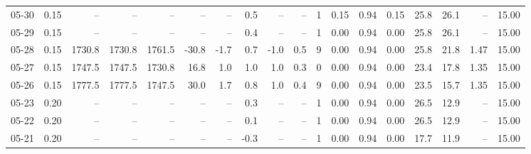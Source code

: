\begin{threeparttable}
{\begin{tabular}{lrrrrrrrrrrrrrrrrr}
  05-30 &     0.15 &     -- &     -- &     -- &         -- &             -- &                       0.5 &                       -- &                  -- &              1 &       0.15 &      0.94 &           0.15 &             25.8 &                26.1 &              -- &                  15.00 \\
  05-29 &     0.15 &     -- &     -- &     -- &         -- &             -- &                       0.4 &                       -- &                  -- &              1 &       0.00 &      0.94 &           0.00 &             25.8 &                26.1 &              -- &                  15.00 \\
  05-28 &     0.15 & 1730.8 & 1730.8 & 1761.5 &      -30.8 &           -1.7 &                       0.7 &                     -1.0 &                 0.5 &              9 &       0.00 &      0.94 &           0.00 &             25.8 &                21.8 &            1.47 &                  15.00 \\
  05-27 &     0.15 & 1747.5 & 1747.5 & 1730.8 &       16.8 &            1.0 &                       1.0 &                      1.0 &                 0.3 &              0 &       0.00 &      0.94 &           0.00 &             23.4 &                17.8 &            1.35 &                  15.00 \\
  05-26 &     0.15 & 1777.5 & 1777.5 & 1747.5 &       30.0 &            1.7 &                       0.8 &                      1.0 &                 0.4 &              9 &       0.00 &      0.94 &           0.00 &             23.5 &                15.7 &            1.35 &                  15.00 \\
  05-23 &     0.20 &     -- &     -- &     -- &         -- &             -- &                       0.3 &                       -- &                  -- &              1 &       0.00 &      0.94 &           0.00 &             26.5 &                12.9 &              -- &                  15.00 \\
  05-22 &     0.20 &     -- &     -- &     -- &         -- &             -- &                       0.1 &                       -- &                  -- &              1 &       0.00 &      0.94 &           0.00 &             26.5 &                12.9 &              -- &                  15.00 \\
  05-21 &     0.20 &     -- &     -- &     -- &         -- &             -- &                      -0.3 &                       -- &                  -- &              1 &       0.00 &      0.94 &           0.00 &             17.7 &                11.9 &              -- &                  15.00 \\

\end{tabular}}
\end{threeparttable}
